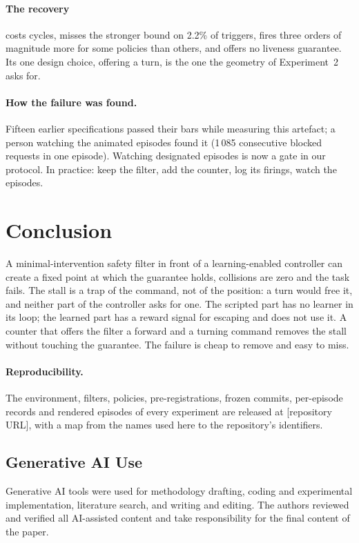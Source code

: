 \documentclass{l4dc2027}
\begin{document}
\paragraph{The recovery} costs cycles, misses the stronger bound on 2.2\% of triggers, fires three orders of magnitude more for some policies than others, and offers no liveness guarantee. Its one design choice, offering a turn, is the one the geometry of Experiment~2 asks for.

\paragraph{How the failure was found.} Fifteen earlier specifications passed their bars while measuring this artefact; a person watching the animated episodes found it (1\,085 consecutive blocked requests in one episode). Watching designated episodes is now a gate in our protocol. In practice: keep the filter, add the counter, log its firings, watch the episodes.

\section{Conclusion}\label{sec:conclusion}

A minimal-intervention safety filter in front of a learning-enabled controller can create a fixed point at which the guarantee holds, collisions are zero and the task fails. The stall is a trap of the command, not of the position: a turn would free it, and neither part of the controller asks for one. The scripted part has no learner in its loop; the learned part has a reward signal for escaping and does not use it. A counter that offers the filter a forward and a turning command removes the stall without touching the guarantee. The failure is cheap to remove and easy to miss.

\paragraph{Reproducibility.} The environment, filters, policies, pre-registrations, frozen commits, per-episode records and rendered episodes of every experiment are released at [repository URL], with a map from the names used here to the repository's identifiers.

\subsection*{Generative AI Use}

Generative AI tools were used for methodology drafting, coding and experimental implementation, literature search, and writing and editing. The authors reviewed and verified all AI-assisted content and take responsibility for the final content of the paper.


\end{document}
